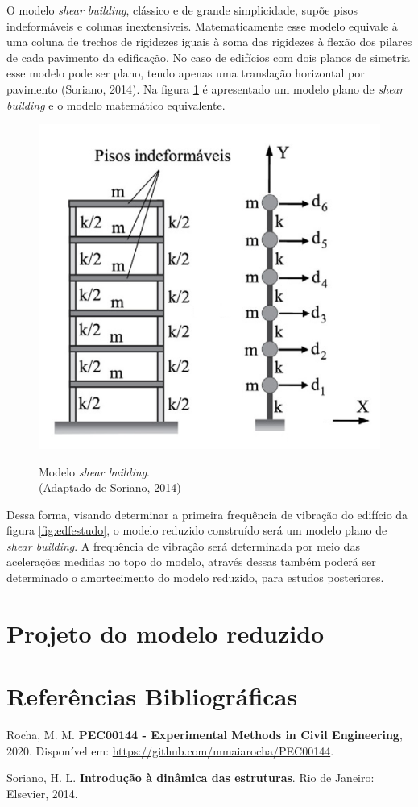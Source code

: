O modelo \textit{shear building}, clássico e de grande simplicidade, supõe pisos indeformáveis e colunas inextensíveis. Matematicamente esse modelo equivale à uma coluna de trechos de rigidezes iguais à soma das rigidezes à flexão dos pilares de cada pavimento da edificação. No caso de edifícios com dois planos de simetria esse modelo pode ser plano, tendo apenas uma translação horizontal por pavimento (Soriano, 2014). Na figura \ref{fig:shearb} é apresentado um modelo plano de \textit{shear building} e o modelo matemático equivalente. 

\begin{figure}
	\centering
	\caption{Modelo \textit{shear building}.\\ \small{(Adaptado de Soriano, 2014)}}
	\includegraphics[scale=0.39]{../Images/ShearBuilding}
	\label{fig:shearb}
\end{figure}


Dessa forma, visando determinar a primeira frequência de vibração do edifício da figura \ref{fig:edfestudo}, o modelo reduzido construído será um modelo plano de \textit{shear building}. A frequência de vibração será determinada por meio das acelerações medidas no topo do modelo, através dessas também poderá ser determinado o amortecimento do modelo reduzido, para estudos posteriores. 


\section{Projeto do modelo reduzido}




\section{Referências Bibliográficas}

Rocha, M. M. \textbf{PEC00144 - Experimental Methods in Civil Engineering}, 2020. 
Disponível em: \url{https://github.com/mmaiarocha/PEC00144}.

Soriano, H. L. \textbf{Introdução à dinâmica das estruturas}. Rio de Janeiro: Elsevier, 2014.

    



